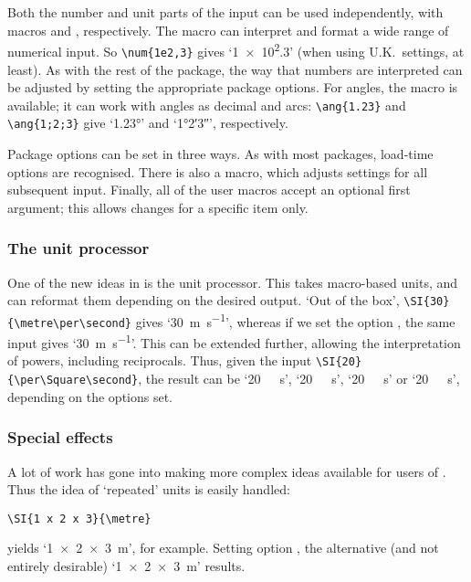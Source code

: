 \begin{bibunit}
Both the number and unit parts of the input can be used
independently, with macros  and , respectively.
The  macro can interpret and format a wide range of
numerical input.  So \verb|\num{1e2,3}| gives `\num{1e2,3}'
(when using U.K.~settings, at least).  As with the rest of the
package, the way that numbers are interpreted can be adjusted
by setting the appropriate package options.  For angles, the
 macro is available; it can work with angles as decimal
and arcs: \verb|\ang{1.23}| and  \verb|\ang{1;2;3}| give
`\ang{1.23}' and `\ang{1;2;3}', respectively.

Package options can be set in three ways.  As with most
packages, load-time options are recognised.  There is also a
 macro, which adjusts settings for all subsequent
input.  Finally, all of the user macros accept an optional
first argument; this allows changes for a specific item only.

\subsubsection{The unit processor}

One of the new ideas in  is the unit processor.
This takes macro-based units, and can reformat them depending
on the desired output.  `Out of the box',
\verb|\SI{30}{\metre\per\second}| gives
`\SI{30}{\metre\per\second}', whereas if we set the option
, the same input gives
`\SI[per=slash]{30}{\metre\per\second}'. This can be extended
further, allowing the interpretation of powers, including
reciprocals.  Thus, given the input
\verb|\SI{20}{\per\Square\second}|, the result can be
`\SI{20}{\per\Square\second}',
`\SI[per=slash]{20}{\per\Square\second}',
`\SI[per=frac]{20}{\per\Square\second}' or
`\SI[per=frac,fraction=nice]{20}{\per\Square\second}',
depending on the options set.

\subsubsection{Special effects}

A lot of work has gone into making more complex ideas available
for users of .  Thus the idea of `repeated'
units is easily handled:
\begin{verbatim}
\SI{1 x 2 x 3}{\metre}
\end{verbatim}
yields `\SI{1x2x3}{\metre}', for example.  Setting option
, the alternative (and not entirely
desirable) `\SI[repeatunits=false]{1x2x3}{\metre}' results.


\end{bibunit}
